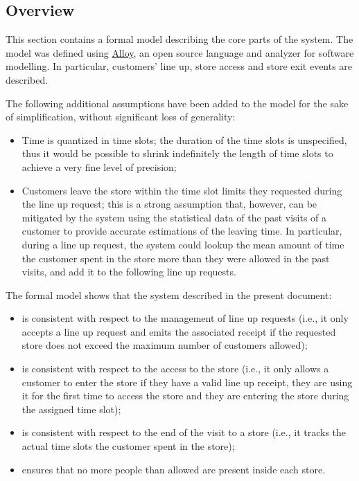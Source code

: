 \documentclass[../../main.tex]{subfiles}
\begin{document}
\subsection{Overview}

This section contains a formal model describing the core parts of the system. The model was defined using \href{https://alloytools.org/}{Alloy}, an open source language and analyzer for software modelling. In particular, customers' line up, store access and store exit events are described.

The following additional assumptions have been added to the model for the sake of simplification, without significant loss of generality:
\begin{itemize}
  \item Time is quantized in time slots; the duration of the time slots is unspecified, thus it would be possible to shrink indefinitely the length of time slots to achieve a very fine level of precision;
  \item Customers leave the store within the time slot limits they requested during the line up request; this is a strong assumption that, however, can be mitigated by the system using the statistical data of the past visits of a customer to provide accurate estimations of the leaving time. In particular, during a line up request, the system could lookup the mean amount of time the customer spent in the store more than they were allowed in the past visits, and add it to the following line up requests.
\end{itemize}

The formal model shows that the system described in the present document:
\begin{itemize}
  \item is consistent with respect to the management of line up requests (i.e., it only accepts a line up request and emits the associated receipt if the requested store does not exceed the maximum number of customers allowed);
  \item is consistent with respect to the access to the store (i.e., it only allows a customer to enter the store if they have a valid line up receipt, they are using it for the first time to access the store and they are entering the store during the assigned time slot);
  \item is consistent with respect to the end of the visit to a store (i.e., it tracks the actual time slots the customer spent in the store);
  \item ensures that no more people than allowed are present inside each store.
\end{itemize}
\end{document}

